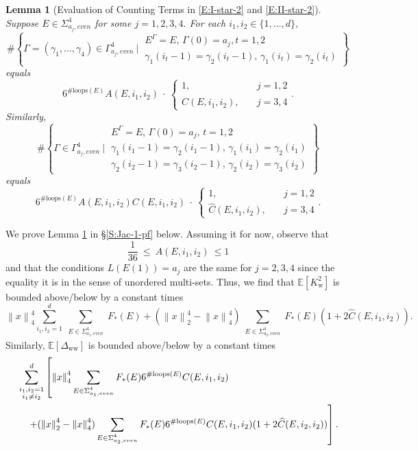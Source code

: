 \documentclass[11pt, reqno]{amsart}
\newtheorem{lemma}[theorem]{Lemma}
\newcommand{\E}[1]{{\mathbb E}\left [#1\right]}
\newcommand{\lr}[1]{\ensuremath{\left(#1 \right)}}
\newcommand{\norm}[1]{\left\lVert#1\right\rVert}
\newcommand{\set}[1]{\ensuremath{\{#1\}}}
\newcommand{\Kw}{K_{\mathrm{w}}}
\newcommand{\Dww}{\Delta_{\mathrm{ww}}}
\begin{document}
\begin{lemma}[Evaluation of Counting Terms in \eqref{E:I-star-2} and \eqref{E:II-star-2}] \label{L:Jac-1}
Suppose $E \in \Sigma_{a_j, even}^4$ for some $j=1,2,3,4.$ For each $i_1,i_2\in \set{1,\ldots, d},$ 
\[\#\left\{\Gamma=\lr{\gamma_1,\ldots, \gamma_4}\in \Gamma_{a_j, even}^4~\big|~\substack{E^\Gamma=E,\,\Gamma(0)=a_j,t=1,2\\\gamma_1(i_t-1)=\gamma_2(i_t-1),\,\gamma_1(i_t)=\gamma_2(i_t)}\right\}\]
equals 
\begin{equation}\label{E:E-Jac-1}
6^{\#\text{loops}(E)}A(E,i_1,i_2)~\cdot~
\begin{cases}
  1,&\quad j=1,2\\
  \widehat{C}(E,i_1,i_2),&\quad j=3,4
\end{cases}.
\end{equation}
Similarly, 
\[\#\left\{\Gamma\in \Gamma_{a_j, even}^4~\big|~\substack{E^\Gamma=E,\,\Gamma(0)=a_j,\,t=1,2\\\gamma_1(i_1-1)=\gamma_2(i_1-1),\, \gamma_1(i_1)=\gamma_2(i_1)\\\gamma_2(i_2-1)=\gamma_3(i_2-1),\,\gamma_2(i_2)=\gamma_3(i_2)}\right\}\]
equals
\begin{equation}\label{E:E-Jac-2}
6^{\#\text{loops}(E)}A(E,i_1,i_2)C(E,i_1,i_2)~\cdot~
\begin{cases}
  1,&\quad j=1,2\\
  \widehat{C}(E,i_1,i_2),&\quad j=3,4
\end{cases}.
\end{equation}
\end{lemma}
\noindent We prove Lemma \ref{L:Jac-1} in \S \ref{S:Jac-1-pf} below. Assuming it for now, observe that 
\[\frac{1}{36}~\leq~ A(E,i_1,i_2)~\leq 1\]
and that the conditions $L(E(1))=a_j$ are the same for $j=2,3,4$ since the equality it is in the sense of unordered multi-sets. Thus, we find that $\E{\Kw^2}$ is bounded above/below by a constant times
\begin{equation}\label{E:K-bounds}
\norm{x}_4^4\sum_{i_1,i_2=1}^d \sum_{\substack{E\in \Sigma_{a_1, even}^4}} F_*(E) + (\norm{x}_2^4-\norm{x}_4^4)\sum_{\substack{E\in \Sigma_{a_2,even}^4}} F_*(E)(1+2\widehat{C}(E,i_1,i_2)).
\end{equation}
Similarly, $\E{\Dww}$ is bounded above/below by a constant times
\begin{align}
\label{E:deltaK-bounds}&\sum_{\substack{i_1,i_2=1\\i_1\neq i_2}}^d \left[\norm{x}_4^4\sum_{\substack{E\in \Sigma_{a_1,even}^4}} F_*(E)6^{\#\text{loops}(E)}C(E,i_1,i_2) \right.\\
\notag &\quad\left.+ (\norm{x}_2^4-\norm{x}_4^4)\sum_{\substack{E\in \Sigma_{a_2,even}^4}} F_*(E)6^{\#\text{loops}(E)}C(E,i_1,i_2)(1+2\widehat{C}(E,i_2,i_2))\right].
\end{align}
\end{document}
